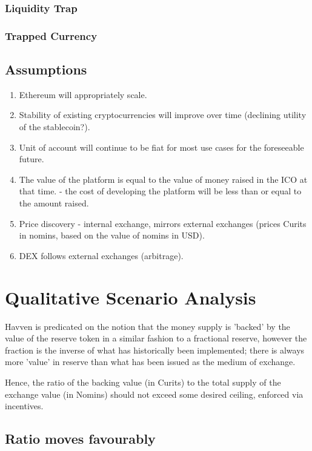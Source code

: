 \documentclass{article}
\begin{document}
\subsubsection{Liquidity Trap}
\subsubsection{Trapped Currency}

\subsection{Assumptions}

\begin{enumerate}
	\item Ethereum will appropriately scale.
	\item Stability of existing cryptocurrencies will improve over time (declining utility of the stablecoin?).
	\item Unit of account will continue to be fiat for most use cases for the foreseeable future.
	\item The value of the platform is equal to the value of money raised in the ICO at that time.
   - the cost of developing the platform will be less than or equal to the amount raised.
	\item Price discovery - internal exchange, mirrors external exchanges (prices Curits in nomins, based on the value of nomins in USD).
	\item DEX follows external exchanges (arbitrage).
\end{enumerate}

\pagebreak
\section{Qualitative Scenario Analysis}

Havven is predicated on the notion that the money supply is 'backed' by the value of the reserve token in a similar fashion to a fractional reserve, however the fraction is the inverse of what has historically been implemented; there is always more 'value' in reserve than what has been issued as the medium of exchange.

\noindent Hence, the ratio of the backing value (in Curits) to the total supply of the exchange value (in Nomins) should not exceed some desired ceiling, enforced via incentives.

\subsection{Ratio moves favourably}
\end{document}
